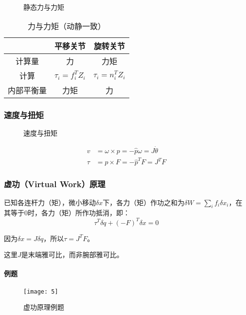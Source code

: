 \documentclass[
12pt, %
a4paper, 
oneside, %
headinclude,footinclude, %
]{scrartcl}
\begin{document}
\begin{figure}[H]
\centering
{} \quad
{} \quad
{}
\caption[静态力与力矩]{静态力与力矩}
\end{figure}

\begin{table}[H]
\centering
\begin{tabular}{c|cc}
\hline
& 平移关节 & 旋转关节 \\
\hline
计算量 & 力 & 力矩 \\
计算 & $ \tau_i = f_i^T Z_i $ & $ \tau_i = n_i^T Z_i $ \\
内部平衡量 & 力矩 & 力 \\
\hline
\end{tabular}
\caption{力与力矩（动静一致）}
\end{table}
\subsubsection[速度与扭矩]{速度与扭矩}
\begin{figure}[H]
\centering
\subfloat[角速度与线速度]{\texttt{[image: wv]}} \quad
\subfloat[力与扭矩]{\texttt{[image: ft]}}
\caption[速度与扭矩]{速度与扭矩}
\end{figure}

\begin{align*}
v &= \omega \times p = -\hat{p} \omega = J \dot{\theta} \\
\tau &= p \times F = -\hat{p}^T F = J^T F
\end{align*}
\subsubsection[虚功原理]{虚功（Virtual Work）原理}
已知各连杆力（矩），微小移动$ \delta x $下，各力（矩）作功之和为$ \delta W = \sum_i f_i \delta x_i $，在其等于$ 0 $时，各力（矩）所作功抵消，即：
$$ \tau^T \delta q + (-F)^T \delta x = 0 $$

因为$ \delta x = J \delta q $，所以$ \tau = J^T F $。

这里$ J $是末端雅可比，而非腕部雅可比。
\paragraph{例题}
\begin{figure}[H]
\centering 
\texttt{[image: 5]} 
\caption[虚功原理例题]{虚功原理例题}
\end{figure}
\end{document}
